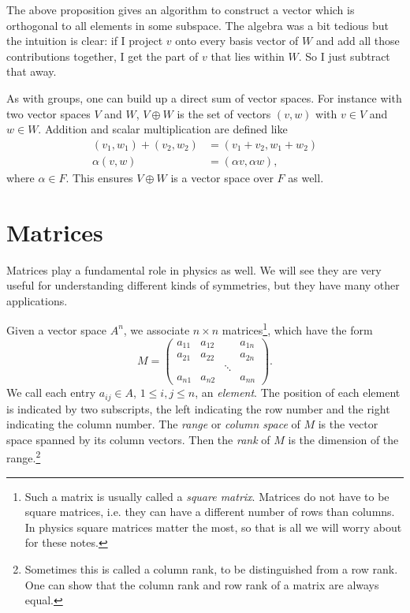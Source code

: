 The above proposition gives an algorithm to construct
a vector which is orthogonal to all elements in some subspace.
The algebra was a bit tedious but the intuition is clear:
if I project $v$ onto every basis vector of $W$ and add all
those contributions together, I get the part of $v$ that lies
within $W$. So I just subtract that away.

As with groups, one can build up a direct sum
of vector spaces. For instance with two vector spaces $V$ and $W$,
$V\oplus W$ is the set of vectors $(v,w)$ with $v\in V$ and $w\in W$.
Addition and scalar multiplication are defined like
\begin{equation}\begin{aligned}
(v_1,w_1)+(v_2,w_2)&=(v_1+v_2,w_1+w_2)\\
\alpha(v,w)&=(\alpha v,\alpha w),
\end{aligned}\end{equation}
where $\alpha\in F$. This ensures $V\oplus W$ is a vector space
over $F$ as well.

\section{Matrices}

Matrices play a fundamental role in physics as well.
We will see they are very useful for understanding different kinds of
symmetries, but they have many other applications.

Given a vector space $A^n$, we associate
$n\times n$ matrices\footnote{Such a matrix is usually called a {\it square
matrix}. Matrices do not have to be square matrices, i.e. they can have a
different number of rows than columns. In physics square
matrices matter the most, so that is all we will worry about for these notes.},
which have the form
\begin{equation}\label{eq:basicMatrix}
  M=\left(\begin{array}{cccc}
          a_{11}   & a_{12} &       & a_{1n}\\
          a_{21}   & a_{22} &       & a_{2n}\\
                   &        & \ddots&       \\
          a_{n1}   & a_{n2} &       & a_{nn}
            \end{array}\right). 
\end{equation}
We call each entry $a_{ij}\in A$, $1\leq i,j\leq n$, an {\it element}. The position
of each element is indicated by two subscripts, the left
indicating the row number and the right indicating the column number.
The {\it range} or {\it column space} of $M$ is the vector space
spanned by its column vectors.
Then the {\it rank} of $M$ is the dimension of the 
range.\footnote{Sometimes this is called a column rank, to be
distinguished from a row rank. One can show that the column rank and row rank of
a matrix are always equal.} 

